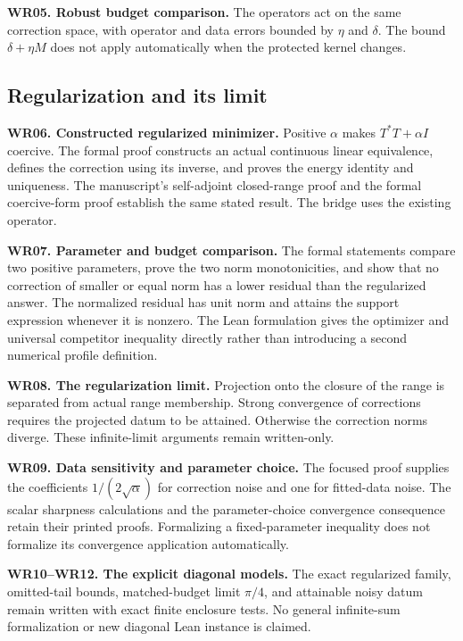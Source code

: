 \textbf{WR05. Robust budget comparison.} The operators act on the same correction space, with operator and data errors bounded by $\eta$ and $\delta$. The bound $\delta+\eta M$ does not apply automatically when the protected kernel changes.

\subsection{Regularization and its limit}
\textbf{WR06. Constructed regularized minimizer.} Positive $\alpha$ makes $T^*T+\alpha I$ coercive. The formal proof constructs an actual continuous linear equivalence, defines the correction using its inverse, and proves the energy identity and uniqueness. The manuscript's self-adjoint closed-range proof and the formal coercive-form proof establish the same stated result. The bridge uses the existing  operator.

\textbf{WR07. Parameter and budget comparison.} The formal statements compare two positive parameters, prove the two norm monotonicities, and show that no correction of smaller or equal norm has a lower residual than the regularized answer. The normalized residual has unit norm and attains the support expression whenever it is nonzero. The Lean formulation gives the optimizer and universal competitor inequality directly rather than introducing a second numerical profile definition.

\textbf{WR08. The regularization limit.} Projection onto the closure of the range is separated from actual range membership. Strong convergence of corrections requires the projected datum to be attained. Otherwise the correction norms diverge. These infinite-limit arguments remain written-only.

\textbf{WR09. Data sensitivity and parameter choice.} The focused proof supplies the coefficients $1/(2\sqrt\alpha)$ for correction noise and one for fitted-data noise. The scalar sharpness calculations and the parameter-choice convergence consequence retain their printed proofs. Formalizing a fixed-parameter inequality does not formalize its convergence application automatically.

\textbf{WR10--WR12. The explicit diagonal models.} The exact regularized family, omitted-tail bounds, matched-budget limit $\pi/4$, and attainable noisy datum remain written with exact finite enclosure tests. No general infinite-sum formalization or new diagonal Lean instance is claimed.

